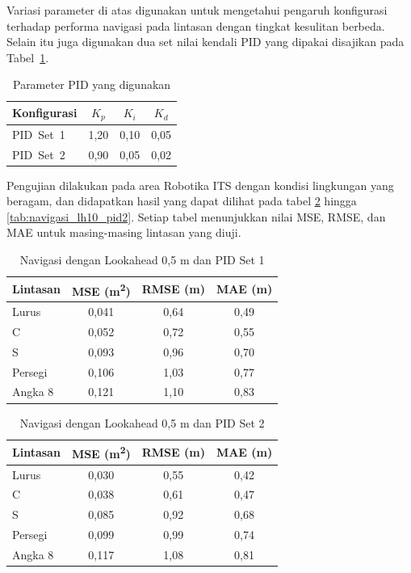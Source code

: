 Variasi parameter di atas digunakan untuk mengetahui pengaruh konfigurasi
terhadap performa navigasi pada lintasan dengan tingkat kesulitan berbeda. Selain itu juga digunakan dua set nilai kendali PID yang dipakai disajikan pada
Tabel~\ref{tab:pid_parameter}.

\begin{table}[H]
  \centering
  \caption{Parameter PID yang digunakan}
  \label{tab:pid_parameter}
  \begin{tabular}{|l|c|c|c|}
    \hline
    Konfigurasi & $K_{p}$ & $K_{i}$ & $K_{d}$ \\ \hline
    PID~Set~1   & 1{,}20  & 0{,}10  & 0{,}05 \\ 
    PID~Set~2   & 0{,}90  & 0{,}05  & 0{,}02 \\ \hline
  \end{tabular}
\end{table}

Pengujian dilakukan pada area Robotika ITS dengan kondisi lingkungan yang beragam, dan didapatkan hasil yang dapat dilihat pada tabel \ref{tab:navigasi_lh05_pid1} hingga \ref{tab:navigasi_lh10_pid2}. Setiap tabel menunjukkan nilai MSE, RMSE, dan MAE untuk masing-masing lintasan yang diuji.

\begin{table}[H]
	\centering
	\caption{Navigasi dengan Lookahead 0{,}5 m dan PID Set 1}
	\label{tab:navigasi_lh05_pid1}
	\begin{tabular}{|l|c|c|c|}
		\hline
		Lintasan & MSE (m\textsuperscript{2}) & RMSE (m) & MAE (m) \\
		\hline
		Lurus    & 0{,041}                    & 0{,64}   & 0{,49}  \\
		C        & 0{,052}                    & 0{,72}   & 0{,55}  \\
		S        & 0{,093}                    & 0{,96}   & 0{,70}  \\
		Persegi  & 0{,106}                    & 1{,03}   & 0{,77}  \\
		Angka 8  & 0{,121}                    & 1{,10}   & 0{,83}  \\
		\hline
	\end{tabular}
\end{table}

\begin{table}[H]
	\centering
	\caption{Navigasi dengan Lookahead 0{,}5 m dan PID Set 2}
	\label{tab:navigasi_lh05_pid2}
	\begin{tabular}{|l|c|c|c|}
		\hline
		Lintasan & MSE (m\textsuperscript{2}) & RMSE (m) & MAE (m) \\
		\hline
		Lurus    & 0{,030}                    & 0{,55}   & 0{,42}  \\
		C        & 0{,038}                    & 0{,61}   & 0{,47}  \\
		S        & 0{,085}                    & 0{,92}   & 0{,68}  \\
		Persegi  & 0{,099}                    & 0{,99}   & 0{,74}  \\
		Angka 8  & 0{,117}                    & 1{,08}   & 0{,81}  \\
		\hline
	\end{tabular}
\end{table}

